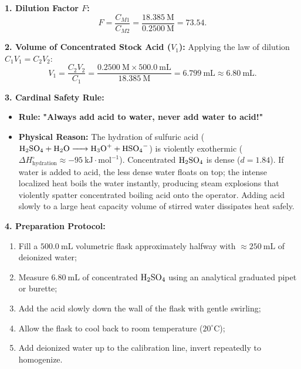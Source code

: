 \begin{solution}
\textbf{1. Dilution Factor $F$:}
\[
F = \frac{C_{M1}}{C_{M2}} = \frac{18.385\ \mathrm{M}}{0.2500\ \mathrm{M}} = \mathbf{73.54}.
\]

\textbf{2. Volume of Concentrated Stock Acid ($V_1$):}
Applying the law of dilution $C_1 V_1 = C_2 V_2$:
\[
V_1 = \frac{C_2 V_2}{C_1} = \frac{0.2500\ \mathrm{M} \times 500.0\ \mathrm{mL}}{18.385\ \mathrm{M}} = \mathbf{6.799\ \mathrm{mL}} \approx \mathbf{6.80\ \mathrm{mL}}.
\]

\textbf{3. Cardinal Safety Rule:}
\begin{itemize}[leftmargin=1.5em,itemsep=2pt]
  \item \textbf{Rule:} \textbf{"Always add acid to water, never add water to acid!"}
  \item \textbf{Physical Reason:} The hydration of sulfuric acid ($\ce{H2SO4 + H2O -> H3O+ + HSO4-}$) is violently exothermic ($\Delta H_{\text{hydration}}^\circ \approx -95\ \mathrm{kJ\cdot mol^{-1}}$). Concentrated $\ce{H2SO4}$ is dense ($d = 1.84$). If water is added to acid, the less dense water floats on top; the intense localized heat boils the water instantly, producing steam explosions that violently spatter concentrated boiling acid onto the operator. Adding acid slowly to a large heat capacity volume of stirred water dissipates heat safely.
\end{itemize}

\textbf{4. Preparation Protocol:}
\begin{enumerate}[leftmargin=1.5em,itemsep=1pt]
  \item Fill a $500.0\ \mathrm{mL}$ volumetric flask approximately halfway with $\approx 250\ \mathrm{mL}$ of deionized water;
  \item Measure $6.80\ \mathrm{mL}$ of concentrated $\ce{H2SO4}$ using an analytical graduated pipet or burette;
  \item Add the acid slowly down the wall of the flask with gentle swirling;
  \item Allow the flask to cool back to room temperature ($20^\circ\mathrm{C}$);
  \item Add deionized water up to the calibration line, invert repeatedly to homogenize.
\end{enumerate}
\end{solution}

